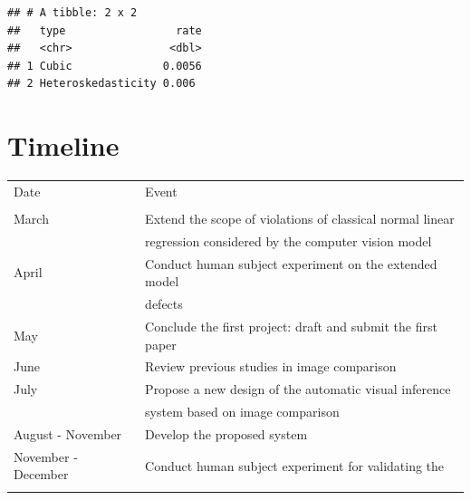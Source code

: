 \documentclass{monashthesis}
\theoremstyle{definition}
\theoremstyle{definition}
\theoremstyle{definition}
\theoremstyle{definition}
\theoremstyle{remark}
\begin{document}
\begin{verbatim}
## # A tibble: 2 x 2
##   type                 rate
##   <chr>               <dbl>
## 1 Cubic              0.0056
## 2 Heteroskedasticity 0.006
\end{verbatim}

\hypertarget{timeline}{%
\chapter{Timeline}\label{timeline}}

\begin{table} \label{tab:timeline}
\centering
\begin{tabular}[t]{ll}
\toprule
\addlinespace[0.5em]
Date & Event\\
\addlinespace[0.5em]
\midrule
\addlinespace[0.5em]
\multicolumn{2}{l}{\textit{\textbf{2022}}}\\
\hspace{4em}March & Extend the scope of violations of classical normal linear\\ 
\addlinespace[0.5em]
\hspace{4em} & regression considered by the computer vision model\\
\addlinespace[0.5em]
\hspace{4em}April & Conduct human subject experiment on the extended model\\ 
\addlinespace[0.5em]
\hspace{4em} & defects\\
\addlinespace[0.5em]
\hspace{4em}May & Conclude the first project: draft and submit the first paper\\
\addlinespace[0.5em]
\hspace{4em}June & Review previous studies in image comparison\\
\addlinespace[0.5em]
\hspace{4em}July & Propose a new design of the automatic visual inference\\
\addlinespace[0.5em]
\hspace{4em} & system based on image comparison\\
\addlinespace[0.5em]
\hspace{4em}August - November & Develop the proposed system\\
\addlinespace[0.5em]
\hspace{4em}November - December & Conduct human subject experiment for validating the\\
\addlinespace[0.5em]

\end{tabular}
\end{table}
\end{document}

